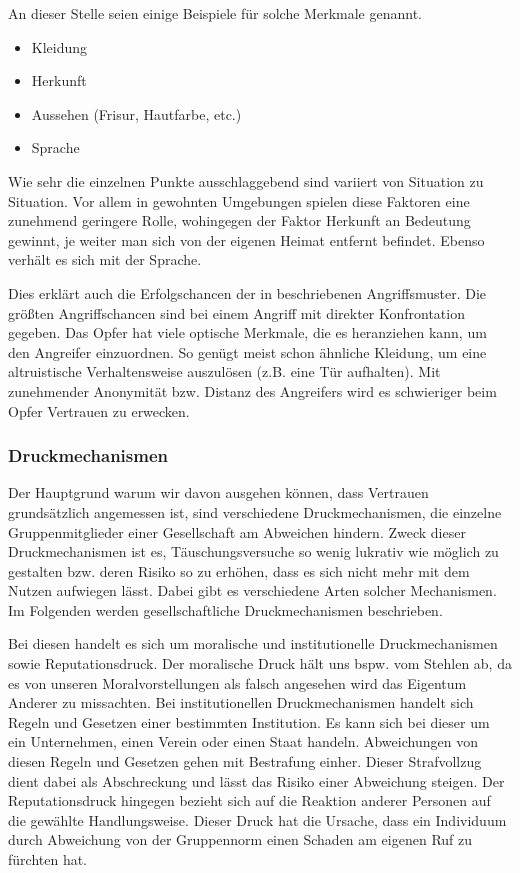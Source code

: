 An dieser Stelle seien einige Beispiele für solche Merkmale genannt.
\begin{itemize}
	\item Kleidung
	\item Herkunft
	\item Aussehen (Frisur, Hautfarbe, etc.)
	\item Sprache
\end{itemize}
Wie sehr die einzelnen Punkte ausschlaggebend sind variiert von Situation zu Situation.
Vor allem in gewohnten Umgebungen spielen diese Faktoren eine zunehmend geringere Rolle, wohingegen der Faktor Herkunft an Bedeutung gewinnt, je weiter man sich von der eigenen Heimat entfernt befindet. Ebenso verhält es sich mit der Sprache.
\citep{liars-and-outliers}

Dies erklärt auch die Erfolgschancen der in  beschriebenen Angriffsmuster.
Die größten Angriffschancen sind bei einem Angriff mit direkter Konfrontation gegeben.
Das Opfer hat viele optische Merkmale, die es heranziehen kann, um den Angreifer einzuordnen.
So genügt meist schon ähnliche Kleidung, um eine altruistische Verhaltensweise auszulösen (z.B. eine Tür aufhalten).
Mit zunehmender Anonymität bzw. Distanz des Angreifers wird es schwieriger beim Opfer Vertrauen zu erwecken.

\subsubsection{Druckmechanismen}\label{sec:druckmechanismen}
Der Hauptgrund warum wir davon ausgehen können, dass Vertrauen grundsätzlich angemessen ist, sind verschiedene Druckmechanismen, die einzelne Gruppenmitglieder einer Gesellschaft am Abweichen hindern.
Zweck dieser Druckmechanismen ist es, Täuschungsversuche so wenig lukrativ wie möglich zu gestalten bzw. deren Risiko so zu erhöhen, dass es sich nicht mehr mit dem Nutzen aufwiegen lässt.
Dabei gibt es verschiedene Arten solcher Mechanismen. Im Folgenden werden gesellschaftliche Druckmechanismen beschrieben.

Bei diesen handelt es sich um moralische und institutionelle Druckmechanismen sowie Reputationsdruck.
Der moralische Druck hält uns bspw. vom Stehlen ab, da es von unseren Moralvorstellungen als falsch angesehen wird das Eigentum Anderer zu missachten.
Bei institutionellen Druckmechanismen handelt sich Regeln und Gesetzen einer bestimmten Institution.
Es kann sich bei dieser um ein Unternehmen, einen Verein oder einen Staat handeln.
Abweichungen von diesen Regeln und Gesetzen gehen mit Bestrafung einher. Dieser Strafvollzug dient dabei als Abschreckung und lässt das Risiko einer Abweichung steigen.
Der Reputationsdruck hingegen bezieht sich auf die Reaktion anderer Personen auf die gewählte Handlungsweise.
Dieser Druck hat die Ursache, dass ein Individuum durch Abweichung von der Gruppennorm einen Schaden am eigenen Ruf zu fürchten hat.

